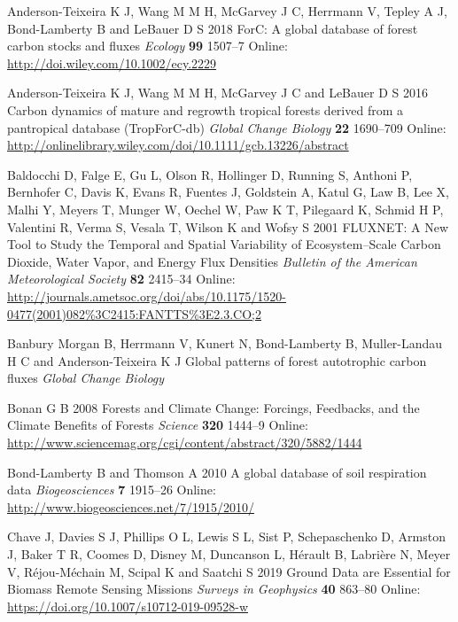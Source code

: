 \documentclass[
]{article}
\begin{document}
\leavevmode\hypertarget{ref-anderson-teixeira_forc_2018}{}%
Anderson-Teixeira K J, Wang M M H, McGarvey J C, Herrmann V, Tepley A J,
Bond-Lamberty B and LeBauer D S 2018 ForC: A global database of forest
carbon stocks and fluxes \emph{Ecology} \textbf{99} 1507--7 Online:
\url{http://doi.wiley.com/10.1002/ecy.2229}

\leavevmode\hypertarget{ref-anderson-teixeira_carbon_2016}{}%
Anderson-Teixeira K J, Wang M M H, McGarvey J C and LeBauer D S 2016
Carbon dynamics of mature and regrowth tropical forests derived from a
pantropical database (TropForC-db) \emph{Global Change Biology}
\textbf{22} 1690--709 Online:
\url{http://onlinelibrary.wiley.com/doi/10.1111/gcb.13226/abstract}

\leavevmode\hypertarget{ref-baldocchi_fluxnet_2001}{}%
Baldocchi D, Falge E, Gu L, Olson R, Hollinger D, Running S, Anthoni P,
Bernhofer C, Davis K, Evans R, Fuentes J, Goldstein A, Katul G, Law B,
Lee X, Malhi Y, Meyers T, Munger W, Oechel W, Paw K T, Pilegaard K,
Schmid H P, Valentini R, Verma S, Vesala T, Wilson K and Wofsy S 2001
FLUXNET: A New Tool to Study the Temporal and Spatial Variability of
Ecosystem--Scale Carbon Dioxide, Water Vapor, and Energy Flux Densities
\emph{Bulletin of the American Meteorological Society} \textbf{82}
2415--34 Online:
\url{http://journals.ametsoc.org/doi/abs/10.1175/1520-0477(2001)082\%3C2415:FANTTS\%3E2.3.CO;2}

\leavevmode\hypertarget{ref-banbury_morgan_global_nodate}{}%
Banbury Morgan B, Herrmann V, Kunert N, Bond-Lamberty B, Muller-Landau H
C and Anderson-Teixeira K J Global patterns of forest autotrophic carbon
fluxes \emph{Global Change Biology}

\leavevmode\hypertarget{ref-bonan_forests_2008}{}%
Bonan G B 2008 Forests and Climate Change: Forcings, Feedbacks, and the
Climate Benefits of Forests \emph{Science} \textbf{320} 1444--9 Online:
\url{http://www.sciencemag.org/cgi/content/abstract/320/5882/1444}

\leavevmode\hypertarget{ref-bond-lamberty_global_2010}{}%
Bond-Lamberty B and Thomson A 2010 A global database of soil respiration
data \emph{Biogeosciences} \textbf{7} 1915--26 Online:
\url{http://www.biogeosciences.net/7/1915/2010/}

\leavevmode\hypertarget{ref-chave_ground_2019}{}%
Chave J, Davies S J, Phillips O L, Lewis S L, Sist P, Schepaschenko D,
Armston J, Baker T R, Coomes D, Disney M, Duncanson L, Hérault B,
Labrière N, Meyer V, Réjou-Méchain M, Scipal K and Saatchi S 2019 Ground
Data are Essential for Biomass Remote Sensing Missions \emph{Surveys in
Geophysics} \textbf{40} 863--80 Online:
\url{https://doi.org/10.1007/s10712-019-09528-w}
\end{document}
